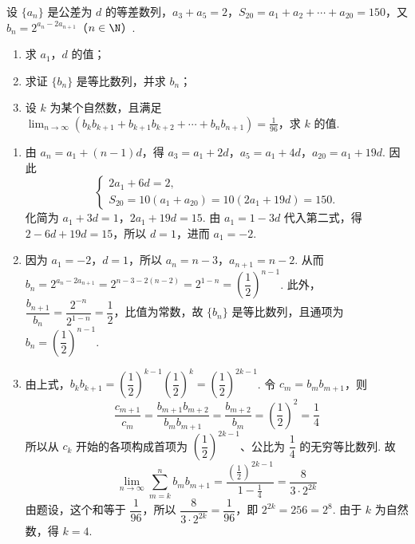 \begin{problem}
设 \(\{a_{n}\}\) 是公差为 \(d\) 的等差数列，\(a_{3} + a_{5} = 2\)，\(S_{20} = a_{1} + a_{2} + \cdots + a_{20} = 150\)，又 \(b_{n} = 2^{a_{n} - 2a_{n+1}}\)（\(n \in \N\)）.

\begin{enumerate}
\item 求 \(a_{1}\)，\(d\) 的值；
\item 求证 \(\{b_{n}\}\) 是等比数列，并求 \(b_{n}\)；
\item 设 \(k\) 为某个自然数，且满足 \(\displaystyle\lim_{n\to\infty}\left(b_k b_{k+1} + b_{k+1} b_{k+2} + \cdots + b_n b_{n+1}\right) = \frac{1}{96}\)，求 \(k\) 的值.
\end{enumerate}
\end{problem}

\begin{solution}
\begin{enumerate}
\item 由 \(a_n=a_1+(n-1)d\)，得 \(a_3=a_1+2d\)，\(a_5=a_1+4d\)，\(a_{20}=a_1+19d\). 因此
\[
\begin{cases}
2a_1+6d=2,\\
S_{20}=10(a_1+a_{20})=10(2a_1+19d)=150.
\end{cases}
\]
化简为 \(a_1+3d=1\)，\(2a_1+19d=15\). 由 \(a_1=1-3d\) 代入第二式，得 \(2-6d+19d=15\)，所以 \(d=1\)，进而 \(a_1=-2\).

\item 因为 \(a_1=-2\)，\(d=1\)，所以 \(a_n=n-3\)，\(a_{n+1}=n-2\). 从而
\(b_n=2^{a_n-2a_{n+1}}=2^{n-3-2(n-2)}=2^{1-n}=\left(\dfrac12\right)^{n-1}\). 此外，\(\dfrac{b_{n+1}}{b_n}=\dfrac{2^{-n}}{2^{1-n}}=\dfrac12\)，比值为常数，故 \(\{b_n\}\) 是等比数列，且通项为 \(b_n=\left(\dfrac12\right)^{n-1}\).

\item 由上式，\(b_kb_{k+1}=\left(\dfrac12\right)^{k-1}\left(\dfrac12\right)^k=\left(\dfrac12\right)^{2k-1}\). 令 \(c_m=b_mb_{m+1}\)，则
\[
\frac{c_{m+1}}{c_m}=\frac{b_{m+1}b_{m+2}}{b_mb_{m+1}}=\frac{b_{m+2}}{b_m}=\left(\frac12\right)^2=\frac14
\]
所以从 \(c_k\) 开始的各项构成首项为 \(\left(\dfrac12\right)^{2k-1}\)、公比为 \(\dfrac14\) 的无穷等比数列. 故
\[
\displaystyle\lim_{n\to\infty}\sum_{m=k}^n b_mb_{m+1}=\frac{\left(\frac12\right)^{2k-1}}{1-\frac14}=\frac{8}{3\cdot2^{2k}}
\]
由题设，这个和等于 \(\dfrac1{96}\)，所以 \(\dfrac{8}{3\cdot2^{2k}}=\dfrac1{96}\)，即 \(2^{2k}=256=2^8\). 由于 \(k\) 为自然数，得 \(k=4\).
\end{enumerate}
\end{solution}

